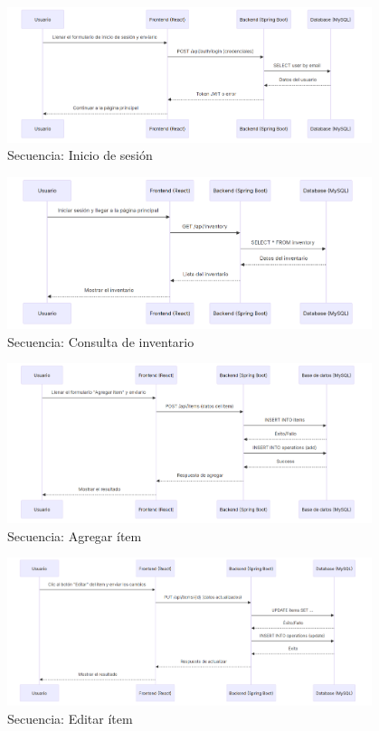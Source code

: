 \begin{figure}[H]
    \centering
    \includegraphics[width=0.95\textwidth]{diagrams/sequence/login}
    \caption{Secuencia: Inicio de sesión}
\end{figure}

\begin{figure}[H]
    \centering
    \includegraphics[width=0.95\textwidth]{diagrams/sequence/view}
    \caption{Secuencia: Consulta de inventario}
\end{figure}

\begin{figure}[H]
    \centering
    \includegraphics[width=0.95\textwidth]{diagrams/sequence/add}
    \caption{Secuencia: Agregar ítem}
\end{figure}

\begin{figure}[H]
    \centering
    \includegraphics[width=0.95\textwidth]{diagrams/sequence/update}
    \caption{Secuencia: Editar ítem}
\end{figure}

